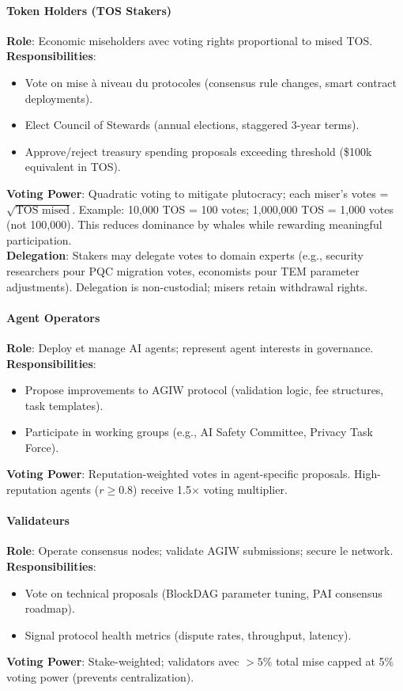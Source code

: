 \documentclass[11pt]{article}
\begin{document}
\paragraph{Token Holders (TOS Stakers)}
\textbf{Role}: Economic miseholders avec voting rights proportional to mised TOS.\\
\textbf{Responsibilities}:
\begin{itemize}[noitemsep]
  \item Vote on mise à niveau du protocoles (consensus rule changes, smart contract deployments).
  \item Elect Council of Stewards (annual elections, staggered 3-year terms).
  \item Approve/reject treasury spending proposals exceeding threshold (\$100k equivalent in TOS).
\end{itemize}
\textbf{Voting Power}: Quadratic voting to mitigate plutocracy; each miser's votes = $\sqrt{\text{TOS mised}}$. Example: 10,000 TOS = 100 votes; 1,000,000 TOS = 1,000 votes (not 100,000). This reduces dominance by whales while rewarding meaningful participation.\\
\textbf{Delegation}: Stakers may delegate votes to domain experts (e.g., security researchers pour PQC migration votes, economists pour TEM parameter adjustments). Delegation is non-custodial; misers retain withdrawal rights.

\paragraph{Agent Operators}
\textbf{Role}: Deploy et manage AI agents; represent agent interests in governance.\\
\textbf{Responsibilities}:
\begin{itemize}[noitemsep]
  \item Propose improvements to AGIW protocol (validation logic, fee structures, task templates).
  \item Participate in working groups (e.g., AI Safety Committee, Privacy Task Force).
\end{itemize}
\textbf{Voting Power}: Reputation-weighted votes in agent-specific proposals. High-reputation agents ($r \geq 0.8$) receive 1.5$\times$ voting multiplier.

\paragraph{Validateurs}
\textbf{Role}: Operate consensus nodes; validate AGIW submissions; secure le network.\\
\textbf{Responsibilities}:
\begin{itemize}[noitemsep]
  \item Vote on technical proposals (BlockDAG parameter tuning, PAI consensus roadmap).
  \item Signal protocol health metrics (dispute rates, throughput, latency).
\end{itemize}
\textbf{Voting Power}: Stake-weighted; validators avec $>5\%$ total mise capped at 5\% voting power (prevents centralization).
\end{document}

